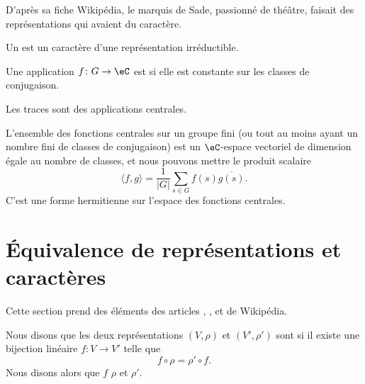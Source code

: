 \tiny
D'après sa fiche Wikipédia, le marquis de Sade, passionné de théâtre, faisait des représentations qui avaient du caractère.
\normalsize


Un  est un caractère d'une représentation irréductible.

\begin{definition}
	Une application \( f\colon G\to \eC\) est  si elle est constante sur les classes de conjugaison.
\end{definition}
Les traces sont des applications centrales.

L'ensemble des fonctions centrales sur un groupe fini (ou tout au moins ayant un nombre fini de classes de conjugaison) est un \( \eC\)-espace vectoriel de dimension égale au nombre de classes, et nous pouvons mettre le produit scalaire
\begin{equation}    \label{EqJrEpVI}
	\langle f, g\rangle =\frac{1}{ | G | }\sum_{s\in G}f(s)\overline{ g(s) }.
\end{equation}
C'est une forme hermitienne sur l'espace des fonctions centrales.

\section{Équivalence de représentations et caractères}

Cette section prend des éléments des articles , ,  et  de Wikipédia.

\begin{definition}
	Nous disons que les deux représentations \( (V,\rho)\) et \( (V',\rho')\) sont  si il existe une bijection linéaire \( f\colon V\to V'\) telle que
	\begin{equation}
		f\circ \rho=\rho'\circ f.
	\end{equation}
	Nous disons alors que \( f\)  \( \rho\) et \( \rho'\).
\end{definition}

